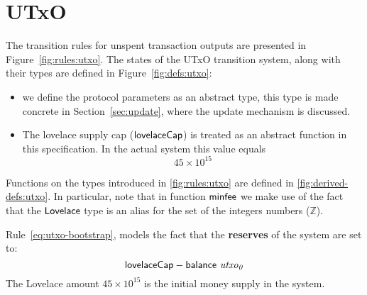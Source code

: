 \newcommand{\PPMMap}{\ensuremath{\type{PParams}}}
\newcommand{\Lmax}{\ensuremath{\mathbb{L}_{\var{max}}}}
\section{UTxO}
\label{sec:state-trans-utxo-1}

The transition rules for unspent transaction outputs are presented in
Figure~\ref{fig:rules:utxo}. The states of the UTxO transition system, along
with their types are defined in Figure~\ref{fig:defs:utxo}:
\begin{itemize}
\item we define the protocol parameters as an abstract type, this type is made
  concrete in Section~\ref{sec:update}, where the update mechanism is
  discussed.
\item The lovelace supply cap ($\mathsf{lovelaceCap}$) is treated as an abstract
  function in this specification. In the actual system this value equals
  $$
  45 \times 10^{15}
  $$
\end{itemize}


Functions on the types introduced in \cref{fig:rules:utxo} are defined in
\cref{fig:derived-defs:utxo}. In particular, note that in function
$\mathsf{minfee}$ we make use of the fact that the $\mathsf{Lovelace}$ type is an alias
for the set of the integers numbers ($\mathbb{Z}$).

Rule~\ref{eq:utxo-bootstrap}, models the fact that the \textbf{reserves} of
the system are set to:
$$ \mathsf{lovelaceCap} - \mathsf{balance}~ \mathit{utxo_0} $$
The Lovelace amount $45 \times 10^{15}$ is the initial money supply in the
system.

